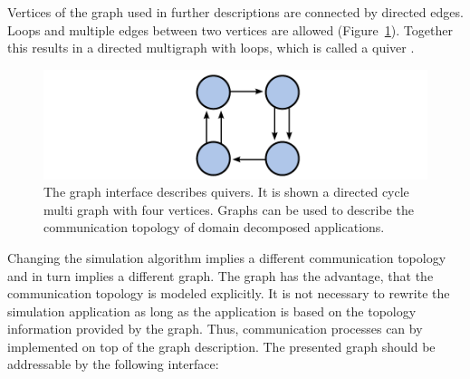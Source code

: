 
Vertices of the graph used in further descriptions are connected by
directed edges.  Loops and multiple edges between two vertices are
allowed (Figure~\ref{fig:graph}). Together this results in a directed
multigraph with loops, which is called a quiver \cite{ref:quiver}.

\begin{figure}[H]
  \centering \includegraphics[width=\textwidth]{graphics/30_graph}
  \caption{The graph interface describes quivers. It is shown a
    directed cycle multi graph with four vertices. Graphs can be
    used to describe the communication topology of domain decomposed
    applications.}
  \label{fig:graph}
\end{figure}

\noindent Changing the simulation algorithm implies a different
communication topology and in turn implies a different graph. The
graph has the advantage, that the communication topology is
modeled explicitly. It is not necessary to rewrite the simulation
application as long as the application is based on the topology
information provided by the graph. Thus, communication processes can
by implemented on top of the graph description. The presented graph
should be addressable by the following interface:

